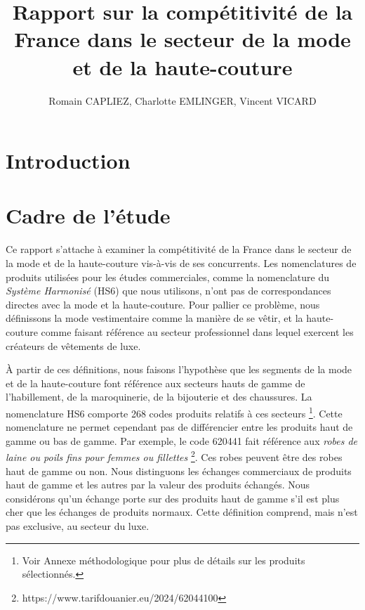 \documentclass[french,10pt,a4paper]{article}
\title{Rapport sur la compétitivité de la France dans le secteur de la mode et de la haute-couture}
\author{Romain CAPLIEZ, Charlotte EMLINGER, Vincent VICARD}
\begin{document}
\maketitle

\newpage
{}
\tableofcontents
{}

\newpage

\section{Introduction}

\newpage

\section{Cadre de l'étude}
Ce rapport s'attache à examiner la compétitivité de la France dans le secteur de la mode et de la haute-couture vis-à-vis de ses concurrents. Les nomenclatures de produits utilisées pour les études commerciales, comme la nomenclature du \textit{Système Harmonisé} (HS6) que nous utilisons, n'ont pas de correspondances directes avec la mode et la haute-couture. Pour pallier ce problème, nous définissons la mode vestimentaire comme la manière de se vêtir, et la haute-couture comme faisant référence au secteur professionnel dans lequel exercent les créateurs de vêtements de luxe.

À partir de ces définitions, nous faisons l'hypothèse que les segments de la mode et de la haute-couture font référence aux secteurs hauts de gamme de l'habillement, de la maroquinerie, de la bijouterie et des chaussures. La nomenclature HS6 comporte 268 codes produits relatifs à ces secteurs \footnote{Voir Annexe méthodologique pour plus de détails sur les produits sélectionnés.}. Cette nomenclature ne permet cependant pas de différencier entre les produits haut de gamme ou bas de gamme. Par exemple, le code 620441 fait référence aux \textit{\og robes de laine ou poils fins pour femmes ou fillettes \fg{}} \footnote{https://www.tarifdouanier.eu/2024/62044100}. Ces robes peuvent être des robes haut de gamme ou non. Nous distinguons les échanges commerciaux de produits haut de gamme et les autres par la valeur des produits échangés. Nous considérons qu'un échange porte sur des produits haut de gamme s'il est plus cher que les échanges de produits \og normaux\fg{}. Cette définition comprend, mais n'est pas exclusive, au secteur du luxe.

\bigskip
\end{document}
